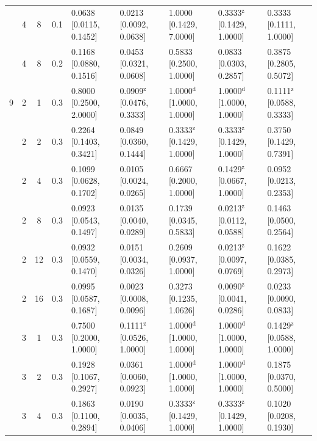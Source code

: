 \begin{tabular}{@{}cccclllll@{}}
 & 4 & 8 & 0.1 & 0.0638 {\tiny[0.0115, 0.1452]} & 0.0213 {\tiny[0.0092, 0.0638]} & 1.0000 {\tiny[0.1429, 7.0000]} & 0.3333$^{\mathrm{z}}$ {\tiny[0.1429, 1.0000]} & 0.3333 {\tiny[0.1111, 1.0000]} \\
 & 4 & 8 & 0.2 & 0.1168 {\tiny[0.0880, 0.1516]} & 0.0453 {\tiny[0.0321, 0.0608]} & 0.5833 {\tiny[0.2500, 1.0000]} & 0.0833 {\tiny[0.0303, 0.2857]} & 0.3875 {\tiny[0.2805, 0.5072]} \\
\midrule
9 & 2 & 1 & 0.3 & 0.8000 {\tiny[0.2500, 2.0000]} & 0.0909$^{\mathrm{z}}$ {\tiny[0.0476, 0.3333]} & 1.0000$^{\mathrm{d}}$ {\tiny[1.0000, 1.0000]} & 1.0000$^{\mathrm{d}}$ {\tiny[1.0000, 1.0000]} & 0.1111$^{\mathrm{z}}$ {\tiny[0.0588, 0.3333]} \\
 & 2 & 2 & 0.3 & 0.2264 {\tiny[0.1403, 0.3421]} & 0.0849 {\tiny[0.0360, 0.1444]} & 0.3333$^{\mathrm{z}}$ {\tiny[0.1429, 1.0000]} & 0.3333$^{\mathrm{z}}$ {\tiny[0.1429, 1.0000]} & 0.3750 {\tiny[0.1429, 0.7391]} \\
 & 2 & 4 & 0.3 & 0.1099 {\tiny[0.0628, 0.1702]} & 0.0105 {\tiny[0.0024, 0.0265]} & 0.6667 {\tiny[0.2000, 1.0000]} & 0.1429$^{\mathrm{z}}$ {\tiny[0.0667, 1.0000]} & 0.0952 {\tiny[0.0213, 0.2353]} \\
 & 2 & 8 & 0.3 & 0.0923 {\tiny[0.0543, 0.1497]} & 0.0135 {\tiny[0.0040, 0.0289]} & 0.1739 {\tiny[0.0345, 0.5833]} & 0.0213$^{\mathrm{z}}$ {\tiny[0.0112, 0.0588]} & 0.1463 {\tiny[0.0500, 0.2564]} \\
 & 2 & 12 & 0.3 & 0.0932 {\tiny[0.0559, 0.1470]} & 0.0151 {\tiny[0.0034, 0.0326]} & 0.2609 {\tiny[0.0937, 1.0000]} & 0.0213$^{\mathrm{z}}$ {\tiny[0.0097, 0.0769]} & 0.1622 {\tiny[0.0385, 0.2973]} \\
 & 2 & 16 & 0.3 & 0.0995 {\tiny[0.0587, 0.1687]} & 0.0023 {\tiny[0.0008, 0.0096]} & 0.3273 {\tiny[0.1235, 1.0626]} & 0.0090$^{\mathrm{z}}$ {\tiny[0.0041, 0.0286]} & 0.0233 {\tiny[0.0090, 0.0833]} \\
 & 3 & 1 & 0.3 & 0.7500 {\tiny[0.2000, 1.0000]} & 0.1111$^{\mathrm{z}}$ {\tiny[0.0526, 1.0000]} & 1.0000$^{\mathrm{d}}$ {\tiny[1.0000, 1.0000]} & 1.0000$^{\mathrm{d}}$ {\tiny[1.0000, 1.0000]} & 0.1429$^{\mathrm{z}}$ {\tiny[0.0588, 1.0000]} \\
 & 3 & 2 & 0.3 & 0.1928 {\tiny[0.1067, 0.2927]} & 0.0361 {\tiny[0.0060, 0.0923]} & 1.0000$^{\mathrm{d}}$ {\tiny[1.0000, 1.0000]} & 1.0000$^{\mathrm{d}}$ {\tiny[1.0000, 1.0000]} & 0.1875 {\tiny[0.0370, 0.5000]} \\
 & 3 & 4 & 0.3 & 0.1863 {\tiny[0.1100, 0.2894]} & 0.0190 {\tiny[0.0035, 0.0406]} & 0.3333$^{\mathrm{z}}$ {\tiny[0.1429, 1.0000]} & 0.3333$^{\mathrm{z}}$ {\tiny[0.1429, 1.0000]} & 0.1020 {\tiny[0.0208, 0.1930]} \\

\end{tabular}
